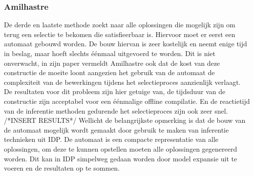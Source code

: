 \subsubsection{Amilhastre}
De derde en laatste methode zoekt naar alle oplossingen die mogelijk zijn om terug een selectie te bekomen die satisfieerbaar is. Hiervoor moet er eerst een automaat gebouwd worden. De bouw hiervan is zeer kostelijk en neemt enige tijd in beslag, maar hoeft slechts \'{e}\'{e}nmaal uitgevoerd te worden. Dit is niet onverwacht, in zijn paper vermeldt Amilhastre ook dat de kost van deze constructie de moeite loont aangezien het gebruik van de automaat de complexiteit van de bewerkingen tijdens het selectieproces aanzienlijk verlaagt. De resultaten voor dit probleem zijn hier getuige van, de tijdsduur van de constructie zijn acceptabel voor een \'{e}\'{e}nmalige offline compilatie. En de reactietijd van de inferentie methoden gedurende het selectieproces zijn ook zeer snel. /*INSERT RESULTS*/
Wellicht de belangrijkste opmerking is dat de bouw van de automaat mogelijk wordt gemaakt door gebruik te maken van inferentie technieken uit IDP. De automaat is een compacte representatie van alle oplossingen, om deze te kunnen opstellen moeten alle oplossingen gegenereerd worden. Dit kan in IDP simpelweg gedaan worden door model expansie uit te voeren en de resultaten op te sommen. 
